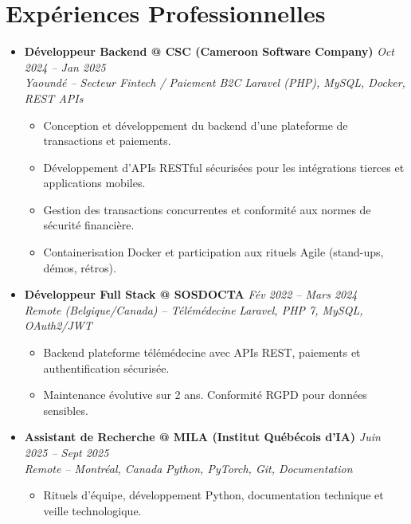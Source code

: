 \documentclass[a4paper,11pt]{article}
\begin{document}
\section{Expériences Professionnelles}
\begin{itemize}[leftmargin=*, label={-}]

\item \textbf{Développeur Backend @ CSC (Cameroon Software Company)} \hfill \textit{Oct 2024 -- Jan 2025} \\
\textit{Yaoundé -- Secteur Fintech / Paiement B2C} \hfill \textit{Laravel (PHP), MySQL, Docker, REST APIs}
\vspace{-2pt}
    \begin{itemize}[leftmargin=0.4cm, nosep, label=\tiny$\bullet$]
        \item \small{Conception et développement du backend d'une plateforme de transactions et paiements.}
        \item \small{Développement d'APIs RESTful sécurisées pour les intégrations tierces et applications mobiles.}
        \item \small{Gestion des transactions concurrentes et conformité aux normes de sécurité financière.}
        \item \small{Containerisation Docker et participation aux rituels Agile (stand-ups, démos, rétros).}
    \end{itemize}
\vspace{3pt}

\item \textbf{Développeur Full Stack @ SOSDOCTA} \hfill \textit{Fév 2022 -- Mars 2024} \\
\textit{Remote (Belgique/Canada) -- Télémédecine} \hfill \textit{Laravel, PHP 7, MySQL, OAuth2/JWT}
\vspace{-2pt}
    \begin{itemize}[leftmargin=0.4cm, nosep, label=\tiny$\bullet$]
        \item \small{Backend plateforme télémédecine avec APIs REST, paiements et authentification sécurisée.}
        \item \small{Maintenance évolutive sur 2 ans. Conformité RGPD pour données sensibles.}
    \end{itemize}
\vspace{3pt}

\item \textbf{Assistant de Recherche @ MILA (Institut Québécois d'IA)} \hfill \textit{Juin 2025 -- Sept 2025} \\
\textit{Remote -- Montréal, Canada} \hfill \textit{Python, PyTorch, Git, Documentation}
\vspace{-2pt}
    \begin{itemize}[leftmargin=0.4cm, nosep, label=\tiny$\bullet$]
        \item \small{Rituels d'équipe, développement Python, documentation technique et veille technologique.}
    \end{itemize}
\vspace{3pt}


\end{itemize}
\end{document}

